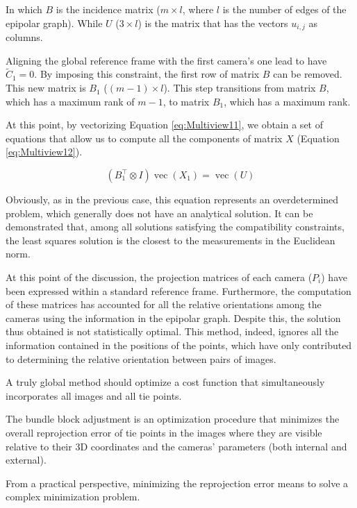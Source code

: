 In which $B$ is the incidence matrix ($m \times l$, where $l$ is the number of edges of the epipolar graph). While $U$ ($3 \times l$) is the matrix that has the vectors $u_{i,j}$ as columns.

Aligning the global reference frame with the first camera's one lead to have $\tilde{C}_1 = 0$.
By imposing this constraint, the first row of matrix $B$ can be removed. This new matrix is $B_1$ ($(m-1) \times l$). 
This step transitions from matrix $B$, which has a maximum rank of $m-1$, to matrix $B_1$, which has a maximum rank.

At this point, by vectorizing Equation \ref{eq:Multiview11}, we obtain a set of equations that allow us to compute all the components of matrix $X$ (Equation \ref{eq:Multiview12}).

\begin{equation}
  (B_1^{\top} \otimes I) \operatorname{vec}(X_1) = \operatorname{vec}(U) 
  \label{eq:Multiview12}
\end{equation}

Obviously, as in the previous case, this equation represents an overdetermined problem, which generally does not have an analytical solution. It can be demonstrated that, among all solutions satisfying the compatibility constraints, the least squares solution is the closest to the measurements in the Euclidean norm.

At this point of the discussion, the projection matrices of each camera ($P_i$) have been expressed within a standard reference frame. Furthermore, the computation of these matrices has accounted for all the relative orientations among the cameras using the information in the epipolar graph. 
Despite this, the solution thus obtained is not statistically optimal. 
This method, indeed, ignores all the information contained in the positions of the points, which have only contributed to determining the relative orientation between pairs of images.

A truly global method should optimize a cost function that simultaneously incorporates all images and all tie points.

The bundle block adjustment is an optimization procedure that minimizes the overall reprojection error of tie points in the images where they are visible relative to their 3D coordinates and the cameras' parameters (both internal and external).

From a practical perspective, minimizing the reprojection error means to solve a complex minimization problem.

